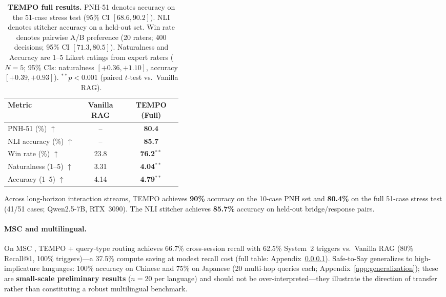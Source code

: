 \documentclass[11pt]{article}
\begin{document}
\begin{table}[t]
  \caption{\textbf{TEMPO full results.} PNH-51 denotes accuracy on the 51-case stress test (95\% CI $[68.6, 90.2]$). NLI denotes stitcher accuracy on a held-out set. Win rate denotes pairwise A/B preference (20 raters; 400 decisions; 95\% CI $[71.3, 80.5]$). Naturalness and Accuracy are 1--5 Likert ratings from expert raters ($N{=}5$; 95\% CIs: naturalness $[+0.36,+1.10]$, accuracy $[+0.39,+0.93]$). $^{**}p{<}0.001$ (paired $t$-test vs.\ Vanilla RAG).}
  \label{tab:all-in-one}
  \centering
  \setlength{\tabcolsep}{3.5pt}
  \setlength{\tabcolsep}{3.5pt}
  \begin{tabular}{p{0.42\linewidth}cc}
    \toprule
    Metric & \shortstack{Vanilla\\RAG} & \shortstack{\textbf{TEMPO}\\\textbf{(Full)}} \\
    \midrule
    PNH-51 (\%) $\uparrow$ & -- & \textbf{80.4} \\
    NLI accuracy (\%) $\uparrow$ & -- & \textbf{85.7} \\
    Win rate (\%) $\uparrow$ & 23.8 & \textbf{76.2}$^{**}$ \\
    Naturalness (1--5) $\uparrow$ & 3.31 & \textbf{4.04}$^{**}$ \\
    Accuracy (1--5) $\uparrow$ & 4.14 & \textbf{4.79}$^{**}$ \\
    \bottomrule
  \end{tabular}
\end{table}

Across long-horizon interaction streams, TEMPO achieves \textbf{90\%} accuracy on the 10-case PNH set and \textbf{80.4\%} on the full 51-case stress test (41/51 cases; Qwen2.5-7B, RTX~3090). The NLI stitcher achieves \textbf{85.7\%} accuracy on held-out bridge/response pairs.

\paragraph{MSC and multilingual.}\label{app:msc}
On MSC \cite{xu2022msc}, TEMPO + query-type routing achieves 66.7\% cross-session recall with 62.5\% System~2 triggers vs.\ Vanilla RAG (80\% Recall@1, 100\% triggers)---a 37.5\% compute saving at modest recall cost (full table: Appendix~\ref{app:msc}).
Safe-to-Say generalizes to high-implicature languages: 100\% accuracy on Chinese and 75\% on Japanese (20 multi-hop queries each; Appendix~\ref{app:generalization}); these are \textbf{small-scale preliminary results} ($n{=}20$ per language) and should not be over-interpreted---they illustrate the direction of transfer rather than constituting a robust multilingual benchmark.
\end{document}
